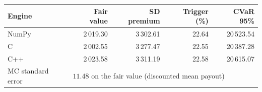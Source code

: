 \begin{tabular}{lrrrr}
\toprule
Engine & Fair value & SD premium & Trigger (\%) & CVaR 95\% \\
\midrule
NumPy & 2\,019.30 & 3\,302.61 & 22.64 & 20\,523.54 \\
C & 2\,002.55 & 3\,277.47 & 22.55 & 20\,387.28 \\
C++ & 2\,023.58 & 3\,311.19 & 22.58 & 20\,615.07 \\
\midrule
MC standard error & \multicolumn{4}{l}{$11.48$ on the fair value (discounted mean payout)} \\
\bottomrule
\end{tabular}
